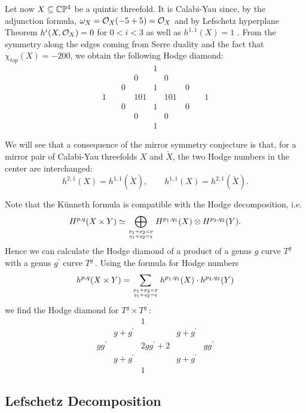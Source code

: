 \documentclass[../main.tex]{subfiles}
\begin{document}
\begin{es} \label{CY3Hodgeex} Let now $X \subseteq \mathbb{C}\mathbb{P}^4$ be a quintic threefold. It is Calabi-Yau since, by the adjunction formula, $\omega_X=\mathcal{O}_X(-5+5)=\mathcal{O}_X$ and by Lefschetz hyperplane Theorem $h^i (X, \mathcal{O}_X) = 0$ for $0 < i < 3$ as well as $h^{1,1}(X) =1$ . From the symmetry along the edges coming from Serre duality and the fact that  $\chi_{top}(X)=-200$, we obtain the following Hodge diamond:
\[\begin{array}{ccccccc}
& & & 1 & & & \\
& & 0 &  & 0 & & \\
& 0\  & & 1 & &\  0 & \\
1\quad &  & 101 & & 101 & &\quad 1\\
& 0\  & & 1 & &\ 0 & \\
& & 0 & & 0 & & \\
& & & 1 & & &
 \end{array}
\]

We will see that a consequence of the mirror symmetry conjecture is that, for a mirror pair of Calabi-Yau threefolds $X$ and $\check{X}$, the two Hodge numbers in the center are interchanged:
\[h^{2,1}(X) = h^{1,1}(\check{X}),  \qquad h^{1,1}(X) = h^{2,1}(\check{X}).\]
\end{es}

\begin{es}
Note that the K\"{u}nneth formula is compatible with the Hodge decomposition, i.e. 
\[
H^{p,q}(X \times Y ) \simeq \bigoplus_{p_1+p_2=p \atop q_1+q_2=q} H^{p_1,q_1}(X) \otimes H^{p_2,q_2}(Y).
    \]
Hence we can calculate the Hodge diamond of a product of a genus $g$ curve $T^g$ with a genus $g^\prime$ curve $T^{g^\prime}$. Using the formula for Hodge numbers 
\[
h^{p,q}(X \times Y ) = \sum_{p_1+p_2=p \atop q_1+q_2=q} h^{p_1,q_1}(X) \cdot h^{p_2,q_2}(Y)
\]
we find the Hodge diamond for $T^g \times T^{g^\prime} $:
\[
\begin{array}{ccccc} & & 1 & & \\
& g + g^\prime & & g + g^\prime &  \\
g g^\prime & & 2g g^\prime + 2  & & g g^\prime \\
&  g + g^\prime & &  g + g^\prime & \\
& & 1 & &  
\end{array}\]


\end{es}


\subsection{Lefschetz Decomposition}
\end{document}

